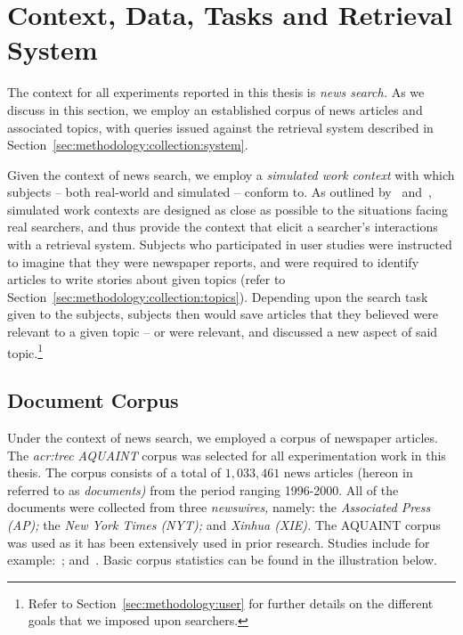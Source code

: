 
\section{Context, Data, Tasks and Retrieval System}\label{sec:methodology:collection}
The context for all experiments reported in this thesis is \emph{news search.} As we discuss in this section, we employ an established corpus of news articles and associated topics, with queries issued against the retrieval system described in Section~\ref{sec:methodology:collection:system}.

Given the context of news search, we employ a \emph{simulated work context} with which subjects -- both real-world and simulated -- conform to. As outlined by~\cite{borlund2000simulated_work_tasks} and~\cite{li2013simulated_work_tasks}, simulated work contexts are designed as close as possible to the situations facing real searchers, and thus provide the context that elicit a searcher's interactions with a retrieval system. Subjects who participated in user studies were instructed to imagine that they were newspaper reports, and were required to identify articles to write stories about given topics (refer to Section~\ref{sec:methodology:collection:topics}). Depending upon the search task given to the subjects, subjects then would save articles that they believed were relevant to a given topic -- or were relevant, and discussed a new aspect of said topic.\footnote{Refer to Section~\ref{sec:methodology:user} for further details on the different goals that we imposed upon searchers.}

\subsection{Document Corpus}\label{sec:methodology:collection:corpus}
Under the context of news search, we employed a corpus of newspaper articles. The \emph{\gls{acr:trec} AQUAINT} corpus was selected for all experimentation work in this thesis. The corpus consists of a total of $1,033,461$ news articles (hereon in referred to as \emph{documents)} from the period ranging 1996-2000. All of the documents were collected from three \emph{newswires,} namely: the \emph{Associated Press (AP);} the \emph{New York Times (NYT);} and \emph{Xinhua (XIE).} The AQUAINT corpus was used as it has been extensively used in prior research. Studies include for example:~\cite{collinsthompson2004retrieval_quality, ofoghi2006passage_retrieval, baillie2006query_sampling, azzopardi2008retrievability, kelly2009user_study, azzopardi2013query_cost, maxwell2014temporal_delays, harvey2017searching, yang2017can}; and~\cite{wilkie2017bias}. Basic corpus statistics can be found in the illustration below.


